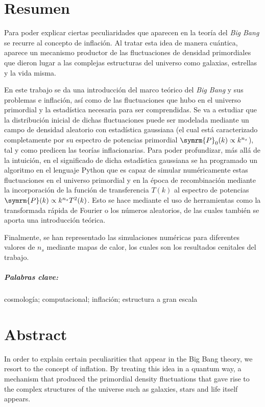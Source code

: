 \chapter*{Resumen}
Para poder explicar ciertas peculiaridades que aparecen en la teoría del \textit{Big Bang} se recurre al concepto de inflación. Al tratar esta idea de manera cuántica, aparece un mecanismo productor de las fluctuaciones de densidad primordiales que dieron lugar a las complejas estructuras del universo como galaxias, estrellas y la vida misma.

En este trabajo se da una introducción del marco teórico del \textit{Big Bang} y sus problemas e inflación, así como de las fluctuaciones que hubo en el universo primordial y la estadística necesaria para ser comprendidas. Se va a estudiar que la distribución inicial de dichas fluctuaciones puede ser modelada mediante un campo de densidad aleatorio con estadística gaussiana (el cual está caracterizado completamente por su espectro de potencias primordial \(\symrm{P}_0(k)\propto k^{n_s}\)), tal y como predicen las teorías inflacionarias. Para poder profundizar, más allá de la intuición, en el significado de dicha estadística gaussiana se ha programado un algoritmo en el lenguaje Python que es capaz de simular numéricamente estas fluctuaciones en el universo primordial y en la época de recombinación mediante la incorporación de la función de transferencia \(T(k)\) al espectro de potencias \(\symrm{P}(k)\propto k^{n_s}T^2(k)\). Esto se hace mediante el uso de herramientas como la transformada rápida de Fourier o los números aleatorios, de las cuales también se aporta una introducción teórica.

Finalmente, se han representado las simulaciones numéricas para diferentes valores de \(n_s\) mediante mapas de calor, los cuales son los resultados cenitales del trabajo.
\paragraph{Palabras clave:} cosmología; computacional; inflación; estructura a gran escala
\chapter*{Abstract}
In order to explain certain peculiarities that appear in the Big Bang theory, we resort to the concept of inflation. By treating this idea in a quantum way, a mechanism that produced the primordial density fluctuations that gave rise to the complex structures of the universe such as galaxies, stars and life itself appears.

